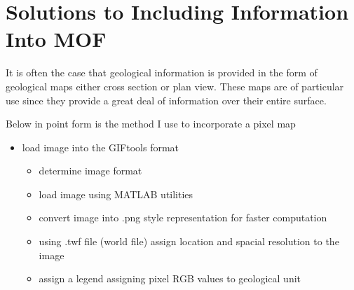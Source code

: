 
\chapter{Solutions to Including Information Into \ac{MOF}}
\label{ch:GIFtools}
%
%
%
%
%
%
%
%	
%
%
%

It is often the case that geological information is provided in the form of geological maps either cross section or plan view. These maps are of particular use since they provide a great deal of information over their entire surface.

Below in point form is the method I use to incorporate a pixel map

\begin{itemize}
\item load image into the GIFtools format
\begin{itemize}
	\item determine image format
	\item load image using MATLAB utilities
	\item convert image into .png style representation for faster computation
	\item using .twf file (world file) assign location and spacial resolution to the image
	\item assign a legend assigning pixel RGB values to geological unit
\end{itemize}
\end{itemize}




